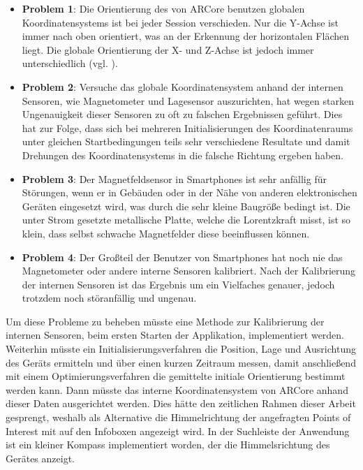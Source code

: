 \begin{itemize}

\item \textbf{Problem 1}: Die Orientierung des von ARCore benutzen globalen Koordinatensystems ist bei jeder Session verschieden. Nur die Y-Achse ist immer nach oben orientiert, was an der Erkennung der horizontalen Flächen liegt. Die globale Orientierung der X- und Z-Achse ist jedoch immer unterschiedlich (vgl. \cite{arcore_geo}).

\item \textbf{Problem 2}: Versuche das globale Koordinatensystem anhand der internen Sensoren, wie Magnetometer und Lagesensor auszurichten, hat wegen starken Ungenauigkeit dieser Sensoren zu oft zu falschen Ergebnissen geführt. Dies hat zur Folge, dass sich bei mehreren Initialisierungen des Koordinatenraums unter gleichen Startbedingungen teils sehr verschiedene Resultate und damit Drehungen des Koordinatensystems in die falsche Richtung ergeben haben. 

\item \textbf{Problem 3}: Der Magnetfeldsensor in Smartphones ist sehr anfällig für Störungen, wenn er in Gebäuden oder in der Nähe von anderen elektronischen Geräten eingesetzt wird, was durch die sehr kleine Baugröße bedingt ist. Die unter Strom gesetzte metallische Platte, welche die Lorentzkraft misst, ist so klein, dass selbst schwache Magnetfelder diese beeinflussen können.

\item \textbf{Problem 4}: Der Großteil der Benutzer von Smartphones hat noch nie das Magnetometer oder andere interne Sensoren kalibriert. Nach der Kalibrierung der internen Sensoren ist das Ergebnis um ein Vielfaches genauer, jedoch trotzdem noch störanfällig und ungenau.
\end{itemize}

Um diese Probleme zu beheben müsste eine Methode zur Kalibrierung der internen Sensoren, beim ersten Starten der Applikation, implementiert werden. Weiterhin müsste ein Initialisierungsverfahren die Position, Lage und Ausrichtung des Geräts ermitteln und über einen kurzen Zeitraum messen, damit anschließend mit einem Optimierungsverfahren die gemittelte initiale Orientierung bestimmt werden kann. Dann müsste das interne Koordinatensystem von ARCore anhand dieser Daten ausgerichtet werden. Dies hätte den zeitlichen Rahmen dieser Arbeit gesprengt, weshalb als Alternative die Himmelrichtung der angefragten Points of Interest mit auf den Infoboxen angezeigt wird. In der Suchleiste der Anwendung ist ein kleiner Kompass implementiert worden, der die Himmelsrichtung des Gerätes anzeigt. 


